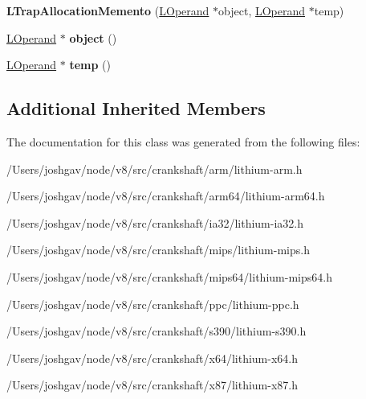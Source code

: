 \begin{DoxyCompactItemize}
\item 
{\bfseries L\+Trap\+Allocation\+Memento} (\hyperlink{classv8_1_1internal_1_1_l_operand}{L\+Operand} $\ast$object, \hyperlink{classv8_1_1internal_1_1_l_operand}{L\+Operand} $\ast$temp)\hypertarget{classv8_1_1internal_1_1_l_trap_allocation_memento_ac6bcdec1f1e7643e817440c9c13e4a81}{}\label{classv8_1_1internal_1_1_l_trap_allocation_memento_ac6bcdec1f1e7643e817440c9c13e4a81}

\item 
\hyperlink{classv8_1_1internal_1_1_l_operand}{L\+Operand} $\ast$ {\bfseries object} ()\hypertarget{classv8_1_1internal_1_1_l_trap_allocation_memento_a8cf93b74c7f72372724621e5c5cfeb06}{}\label{classv8_1_1internal_1_1_l_trap_allocation_memento_a8cf93b74c7f72372724621e5c5cfeb06}

\item 
\hyperlink{classv8_1_1internal_1_1_l_operand}{L\+Operand} $\ast$ {\bfseries temp} ()\hypertarget{classv8_1_1internal_1_1_l_trap_allocation_memento_ac4ad07a7d7d3bf7ca3285e47cbaed844}{}\label{classv8_1_1internal_1_1_l_trap_allocation_memento_ac4ad07a7d7d3bf7ca3285e47cbaed844}

\end{DoxyCompactItemize}
\subsection*{Additional Inherited Members}


The documentation for this class was generated from the following files\+:\begin{DoxyCompactItemize}
\item 
/\+Users/joshgav/node/v8/src/crankshaft/arm/lithium-\/arm.\+h\item 
/\+Users/joshgav/node/v8/src/crankshaft/arm64/lithium-\/arm64.\+h\item 
/\+Users/joshgav/node/v8/src/crankshaft/ia32/lithium-\/ia32.\+h\item 
/\+Users/joshgav/node/v8/src/crankshaft/mips/lithium-\/mips.\+h\item 
/\+Users/joshgav/node/v8/src/crankshaft/mips64/lithium-\/mips64.\+h\item 
/\+Users/joshgav/node/v8/src/crankshaft/ppc/lithium-\/ppc.\+h\item 
/\+Users/joshgav/node/v8/src/crankshaft/s390/lithium-\/s390.\+h\item 
/\+Users/joshgav/node/v8/src/crankshaft/x64/lithium-\/x64.\+h\item 
/\+Users/joshgav/node/v8/src/crankshaft/x87/lithium-\/x87.\+h\end{DoxyCompactItemize}

